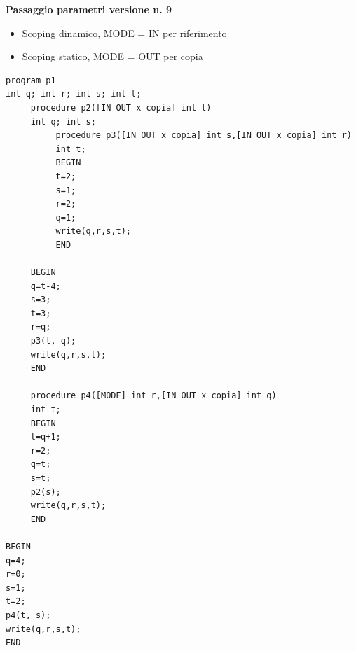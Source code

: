 \documentclass{article}
\begin{document}
\noindent
{\bf Passaggio parametri versione n. 9}\vspace*{-1pt}
\begin{itemize}
\item Scoping dinamico, MODE = IN per riferimento
\item Scoping statico, MODE = OUT per copia
\end{itemize}

\begin{verbatim}
program p1
int q; int r; int s; int t; 
     procedure p2([IN OUT x copia] int t)
     int q; int s; 
          procedure p3([IN OUT x copia] int s,[IN OUT x copia] int r)
          int t; 
          BEGIN
          t=2;
          s=1;
          r=2;
          q=1;
          write(q,r,s,t);
          END

     BEGIN
     q=t-4;
     s=3;
     t=3;
     r=q;
     p3(t, q);
     write(q,r,s,t);
     END

     procedure p4([MODE] int r,[IN OUT x copia] int q)
     int t; 
     BEGIN
     t=q+1;
     r=2;
     q=t;
     s=t;
     p2(s);
     write(q,r,s,t);
     END

BEGIN
q=4;
r=0;
s=1;
t=2;
p4(t, s);
write(q,r,s,t);
END


\end{verbatim}
\newpage
\end{document}
